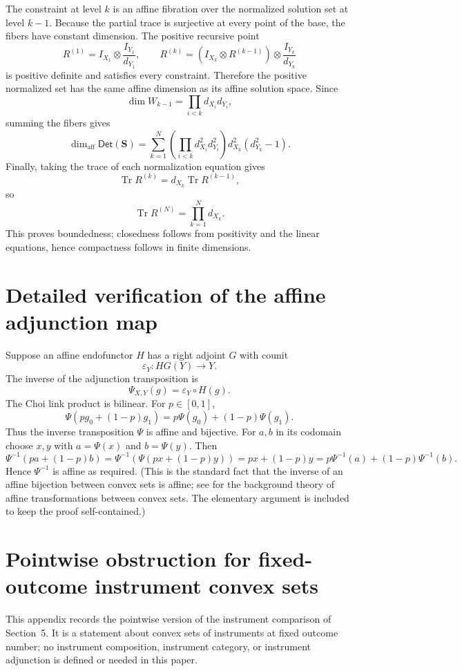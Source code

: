 \documentclass[11pt,a4paper]{article}
\theoremstyle{definition}
\theoremstyle{plain}
\theoremstyle{remark}
\DeclareMathOperator{\Tr}{Tr}
\newcommand{\Det}{\mathsf{Det}}
\newcommand{\affdim}{\dim_{\mathrm{aff}}}
\begin{document}
The constraint at level $k$ is an affine fibration over the normalized
solution set at level $k-1$. Because the partial trace is surjective at
every point of the base, the fibers have constant dimension. The
positive recursive point
\[
R^{(1)}=I_{X_1}\otimes\frac{I_{Y_1}}{d_{Y_1}},
\qquad
R^{(k)}=\left(I_{X_k}\otimes R^{(k-1)}\right)
\otimes\frac{I_{Y_k}}{d_{Y_k}}
\]
is positive definite and satisfies every constraint. Therefore the
positive normalized set has the same affine dimension as its affine
solution space. Since
\[
\dim W_{k-1}=
\prod_{i<k}d_{X_i}d_{Y_i},
\]
summing the fibers gives
\[
\affdim\Det(\mathbf S)=
\sum_{k=1}^N
\left(\prod_{i<k}d_{X_i}^2d_{Y_i}^2\right)
 d_{X_k}^2(d_{Y_k}^2-1).
\]
Finally, taking the trace of each normalization equation gives
\[
\Tr R^{(k)}=d_{X_k}\Tr R^{(k-1)},
\]
so
\[
\Tr R^{(N)}=\prod_{k=1}^Nd_{X_k}.
\]
This proves boundedness; closedness follows from positivity and the
linear equations, hence compactness follows in finite dimensions.

\section{Detailed verification of the affine adjunction map}
\label{app:affinity}

Suppose an affine endofunctor $H$ has a right adjoint $G$ with counit
\[
\varepsilon_Y:HG(Y)\to Y.
\]
The inverse of the adjunction transposition is
\[
\Psi_{X,Y}(g)
=\varepsilon_Y\circ H(g).
\]
The Choi link product is bilinear. For $p\in[0,1]$,
\[
\Psi(p g_0+(1-p)g_1)
=p\Psi(g_0)+(1-p)\Psi(g_1).
\]
Thus the inverse transposition $\Psi$ is affine and bijective. For
$a,b$ in its codomain choose $x,y$ with $a=\Psi(x)$ and $b=\Psi(y)$.
Then
\[
\Psi^{-1}(pa+(1-p)b)
=\Psi^{-1}(\Psi(px+(1-p)y))
=px+(1-p)y
=p\Psi^{-1}(a)+(1-p)\Psi^{-1}(b).
\]
Hence $\Psi^{-1}$ is affine as required. (This is the standard fact that the inverse of an affine bijection between convex sets is affine; see \cite{rockafellar1970} for the background theory of affine transformations between convex sets. The elementary argument is included to keep the proof self-contained.)

\section{Pointwise obstruction for fixed-outcome instrument convex sets}
\label{app:instr}

This appendix records the pointwise version of the instrument comparison
of Section~5. It is a statement about convex sets of instruments at
fixed outcome number; no instrument composition, instrument category, or
instrument adjunction is defined or needed in this paper.
\end{document}
